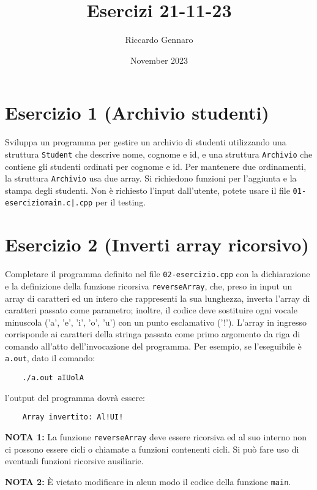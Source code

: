 \documentclass{article}
\title{Esercizi 21-11-23}
\author{Riccardo Gennaro}
\date{November 2023}
\begin{document}
    \maketitle

    \section*{Esercizio 1 (Archivio studenti)}

    
    Sviluppa un programma per gestire un archivio di studenti utilizzando una struttura \texttt{Student} che descrive nome, cognome e id, e una struttura \texttt{Archivio} che contiene gli studenti ordinati per cognome e id. Per mantenere due ordinamenti, la struttura \texttt{Archivio} usa due array.
    Si richiedono funzioni per l'aggiunta e la stampa degli studenti.
    Non è richiesto l'input dall'utente, potete usare il file \texttt{01-esercizio\textunderscore main.c|.cpp} per il testing.

    \section*{Esercizio 2 (Inverti array ricorsivo)}

    Completare il programma definito nel file \texttt{02-esercizio.cpp} con la dichiarazione e la definizione della funzione ricorsiva \texttt{reverseArray}, che, preso in input un array di caratteri ed un intero che rappresenti la sua lunghezza, inverta l'array di caratteri passato come parametro; inoltre, il codice deve sostituire ogni vocale minuscola ('a', 'e', 'i', 'o', 'u') con un punto esclamativo ('!'). L'array in ingresso corrisponde ai caratteri della stringa passata come primo argomento da riga di comando all'atto dell'invocazione del programma. Per esempio, se l'eseguibile è \texttt{a.out}, dato il comando:
    \begin{verbatim}
    ./a.out aIUolA
    \end{verbatim}
    l'output del programma dovrà essere:
    \begin{verbatim}
    Array invertito: Al!UI!
    \end{verbatim}

    \textbf{NOTA 1:} La funzione \texttt{reverseArray} deve essere ricorsiva ed al suo interno non ci possono essere cicli o chiamate a funzioni contenenti cicli. Si può fare uso di eventuali funzioni ricorsive ausiliarie.

    \textbf{NOTA 2:} È vietato modificare in alcun modo il codice della funzione \texttt{main}.
\end{document}
